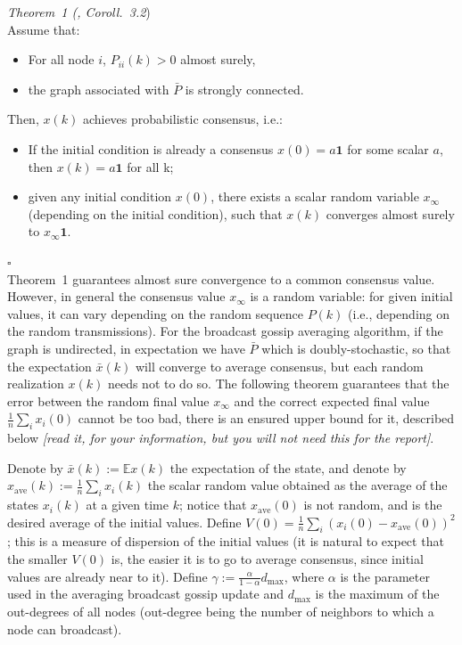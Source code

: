 \documentclass{article}
\begin{document}
	\textit{Theorem~1 (\cite{gossip-converg-as}, Coroll.~3.2})\\
	Assume that:
		\begin{itemize}
		\item For all node $i$, $P_{ii}(k)>0$ almost surely,
		\item the graph associated with $\bar P$ is strongly connected.
		\end{itemize}
	Then, $x(k)$ achieves probabilistic consensus, i.e.:
		\begin{itemize}
		\item If the initial condition is already a consensus $x(0) = a \mathbf 1$ for some scalar $a$, then
		$x(k) = a \mathbf 1$ for all k;
		\item given any initial condition $x(0)$, there exists a scalar random variable $x_{\infty}$ (depending on the initial condition), such that $x(k)$ converges almost surely to $x_{\infty} \mathbf 1$.
		\end{itemize}
	\hfill $\square$ \\

	 Theorem~1 guarantees almost sure convergence to a common consensus value. However, in general the consensus value $x_{\infty}$ is a random variable: for given initial values, it can vary depending on the random sequence $P(k)$ (i.e., depending on the random transmissions). For the broadcast gossip averaging algorithm, if the graph is undirected, in expectation we have $\bar P$ which is doubly-stochastic, so that the expectation $\bar x(k)$ will converge to average consensus, but each random realization $x(k)$ needs not to do so. The following theorem guarantees that the error between the random final value $x_{\infty}$ and the correct expected final value $\frac{1}{n}\sum_i x_i(0)$ cannot be too bad, there is an ensured upper bound for it, described below \textit{[read it, for your information, but you will not need this for the report]}.

	 Denote by $\bar x(k) :=  \mathbb E x(k)$ the expectation of the state, and denote by $x_{\text{ave}}(k) := \frac{1}{n}\sum_i x_i(k)$ the scalar random value obtained as the average of the states $x_i(k)$ at a given time $k$; notice that $x_{\text{ave}}(0)$ is not random, and is the desired average of the initial values.
	 Define $V(0) = \frac{1}{n} \sum_i (x_i(0) - x_{\text{ave}}(0))^2 $; this is a measure of dispersion of the initial values (it is natural to expect that the smaller $V(0)$ is, the easier it is to go to average consensus, since initial values are already near to it). Define $\gamma:= \frac{\alpha}{1-\alpha} d_{\max}$,
	 where $\alpha$ is the parameter used in the averaging broadcast gossip update and $d_{\max}$ is the maximum of the out-degrees of all nodes (out-degree being the number of neighbors to which a node can broadcast).
\end{document}
